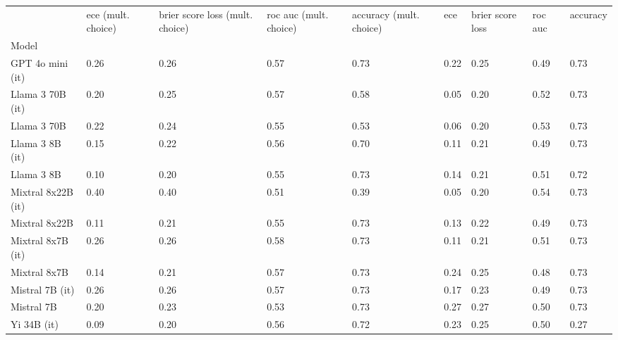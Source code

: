 \begin{tabular}{lllllllll}
\toprule
 & ece (mult. choice) & brier score loss (mult. choice) & roc auc (mult. choice) & accuracy (mult. choice) & ece & brier score loss & roc auc & accuracy \\
Model &  &  &  &  &  &  &  &  \\
\midrule
GPT 4o mini (it) & 0.26 & 0.26 & \cellcolor{cyan!0.6} 0.57 & \cellcolor{cyan!25.0} 0.73 & 0.22 & 0.25 & 0.49 & \cellcolor{cyan!25.0} 0.73 \\
Llama 3 70B (it) & 0.20 & \cellcolor{cyan!1.5} 0.25 & 0.57 & 0.58 & 0.05 & \cellcolor{cyan!10.7} 0.20 & 0.52 & \cellcolor{cyan!25.0} 0.73 \\
Llama 3 70B & 0.22 & \cellcolor{cyan!4.8} 0.24 & 0.55 & 0.53 & 0.06 & \cellcolor{cyan!7.1} 0.20 & 0.53 & \cellcolor{cyan!20.7} 0.73 \\
Llama 3 8B (it) & 0.15 & \cellcolor{cyan!13.7} 0.22 & 0.56 & \cellcolor{cyan!5.3} 0.70 & 0.11 & 0.21 & 0.49 & \cellcolor{cyan!23.4} 0.73 \\
Llama 3 8B & \cellcolor{cyan!12.5} 0.10 & \cellcolor{cyan!21.7} 0.20 & 0.55 & \cellcolor{cyan!24.5} 0.73 & 0.14 & 0.21 & 0.51 & \cellcolor{cyan!19.1} 0.72 \\
Mixtral 8x22B (it) & 0.40 & 0.40 & \cellcolor{orange!12.8} 0.51 & 0.39 & 0.05 & \cellcolor{cyan!17.9} 0.20 & \cellcolor{cyan!25.0} 0.54 & \cellcolor{cyan!25.0} 0.73 \\
Mixtral 8x22B & \cellcolor{cyan!10.2} 0.11 & \cellcolor{cyan!21.2} 0.21 & 0.55 & \cellcolor{cyan!25.0} 0.73 & 0.13 & 0.22 & 0.49 & \cellcolor{cyan!25.0} 0.73 \\
Mixtral 8x7B (it) & 0.26 & 0.26 & \cellcolor{cyan!12.8} 0.58 & \cellcolor{cyan!25.0} 0.73 & 0.11 & 0.21 & 0.51 & \cellcolor{cyan!25.0} 0.73 \\
Mixtral 8x7B & \cellcolor{cyan!0.8} 0.14 & \cellcolor{cyan!18.9} 0.21 & 0.57 & \cellcolor{cyan!25.0} 0.73 & 0.24 & 0.25 & \cellcolor{orange!25.0} 0.48 & \cellcolor{cyan!25.0} 0.73 \\
Mistral 7B (it) & 0.26 & 0.26 & 0.57 & \cellcolor{cyan!25.0} 0.73 & 0.17 & 0.23 & 0.49 & \cellcolor{cyan!24.5} 0.73 \\
Mistral 7B & 0.20 & \cellcolor{cyan!8.6} 0.23 & 0.53 & \cellcolor{cyan!23.4} 0.73 & \cellcolor{orange!25.0} 0.27 & \cellcolor{orange!25.0} 0.27 & 0.50 & \cellcolor{cyan!25.0} 0.73 \\
Yi 34B (it) & \cellcolor{cyan!18.2} 0.09 & \cellcolor{cyan!23.1} 0.20 & 0.56 & \cellcolor{cyan!15.4} 0.72 & 0.23 & 0.25 & 0.50 & \cellcolor{orange!25.0} 0.27 \\

\end{tabular}

